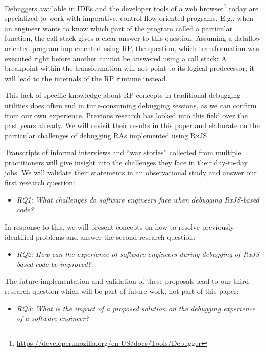 \documentclass[12pt,a4paper]{article}
\begin{document}
Debuggers available in IDEs and the developer tools of a web browser\footnote{\url{https://developer.mozilla.org/en-US/docs/Tools/Debugger}} today are specialized to work with imperative, control-flow oriented programs. E.g., when an engineer wants to know which part of the program called a particular function, the call stack gives a clear answer to this question. Assuming a dataflow oriented program implemented using RP, the question, which transformation was executed right before another cannot be answered using a call stack: A breakpoint within the transformation will not point to its logical predecessor; it will lead to the internals of the RP runtime instead.

This lack of specific knowledge about RP concepts in traditional debugging utilities does often end in time-consuming debugging sessions, as we can confirm from our own experience. Previous research has looked into this field \cite{10.1145/2577080.2577083} \cite{10.1145/2884781.2884815} \cite{10.1145/3180155.3180156} over the past years already. We will revisit their results in this paper and elaborate on the particular challenges of debugging RAs implemented using RxJS.

Transcripts of informal interviews and ``war stories'' collected from multiple practitioners will give insight into the challenges they face in their day-to-day jobs. We will validate their statements in an observational study and answer our first research question:

\begin{itemize}
	\item \emph{RQ1: What challenges do software engineers face when debugging RxJS-based code?}
\end{itemize}

In response to this, we will present concepts on how to resolve previously identified problems and answer the second research question:

\begin{itemize}
	\item \emph{RQ2: How can the experience of software engineers during debugging of RxJS-based code be improved?}
\end{itemize}

The future implementation and validation of these proposals lead to our third research question which will be part of future work, not part of this paper:

\begin{itemize}
	\item \emph{RQ3: What is the impact of a proposed solution on the debugging experience of a software engineer?}
\end{itemize}
\end{document}
